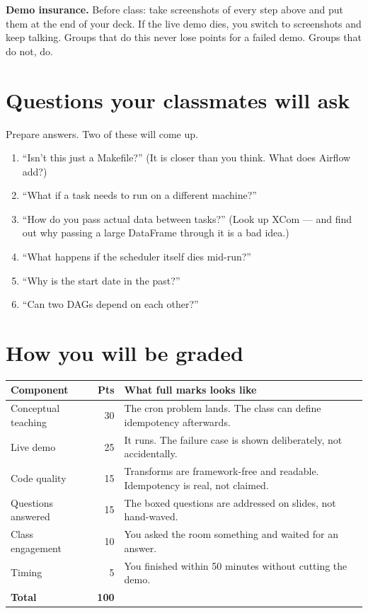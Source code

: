 \documentclass[11pt]{article}
\begin{document}
\begin{warnbox}
\textbf{Demo insurance.} Before class: take screenshots of every step above and
put them at the end of your deck. If the live demo dies, you switch to
screenshots and keep talking. Groups that do this never lose points for a
failed demo. Groups that do not, do.
\end{warnbox}

\section{Questions your classmates will ask}

Prepare answers. Two of these will come up.

\begin{enumerate}
  \item ``Isn't this just a Makefile?'' (It is closer than you think. What does
        Airflow add?)
  \item ``What if a task needs to run on a different machine?''
  \item ``How do you pass actual data between tasks?'' (Look up XCom --- and
        find out why passing a large DataFrame through it is a bad idea.)
  \item ``What happens if the scheduler itself dies mid-run?''
  \item ``Why is the start date in the past?''
  \item ``Can two DAGs depend on each other?''
\end{enumerate}

\section{How you will be graded}

\begin{center}
\small
\begin{tabular}{@{}p{}rp{}@{}}
\toprule
\textbf{Component} & \textbf{Pts} & \textbf{What full marks looks like} \\
\midrule
Conceptual teaching & 30 &
The cron problem lands. The class can define idempotency afterwards. \\
Live demo & 25 &
It runs. The failure case is shown deliberately, not accidentally. \\
Code quality & 15 &
Transforms are framework-free and readable. Idempotency is real, not claimed. \\
Questions answered & 15 &
The boxed questions are addressed on slides, not hand-waved. \\
Class engagement & 10 &
You asked the room something and waited for an answer. \\
Timing & 5 &
You finished within 50 minutes without cutting the demo. \\
\midrule
\textbf{Total} & \textbf{100} & \\
\bottomrule
\end{tabular}
\end{center}
\end{document}
